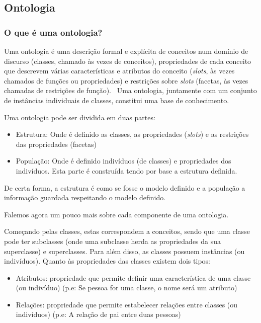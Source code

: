 \subsection{Ontologia}

\subsubsection{O que é uma ontologia?}

Uma ontologia é uma descrição formal e explícita de conceitos num domínio de discurso (classes, chamado às vezes de conceitos), propriedades de cada conceito que descrevem várias características e atributos do conceito (\textit{slots}, às vezes chamados de funções ou propriedades) e restrições sobre \textit{slots} (facetas, às vezes chamadas de restrições de função).~\cite{ontologyProt} Uma ontologia, juntamente com um conjunto de instâncias individuais de classes, constitui uma base de conhecimento.~\cite{ontologyProt}

Uma ontologia pode ser dividida em duas partes:
\begin{itemize}
    \item Estrutura: Onde é definido as classes, as propriedades (\textit{slots}) e as restrições das propriedades (facetas)
    \item População: Onde é definido indivíduos (de classes) e propriedades dos indivíduos. Esta parte é construída tendo por base a estrutura definida.
\end{itemize}
De certa forma, a estrutura é como se fosse o modelo definido e a população a informação guardada respeitando o modelo definido.

Falemos agora um pouco mais sobre cada componente de uma ontologia.

Começando pelas classes, estas correspondem a conceitos, sendo que uma classe pode ter subclasses (onde uma subclasse herda as propriedades da sua superclasse) e superclasses. Para além disso, as classes possuem instâncias (ou indivíduos). Quanto às propriedades das classes existem dois tipos:
\begin{itemize}
    \item Atributos: propriedade que permite definir uma característica de uma classe (ou indivíduo) (p.e: Se pessoa for uma classe, o nome será um atributo)
    \item Relações: propriedade que permite estabelecer relações entre classes (ou indivíduos) (p.e: A relação de pai entre duas pessoas) 
\end{itemize}

